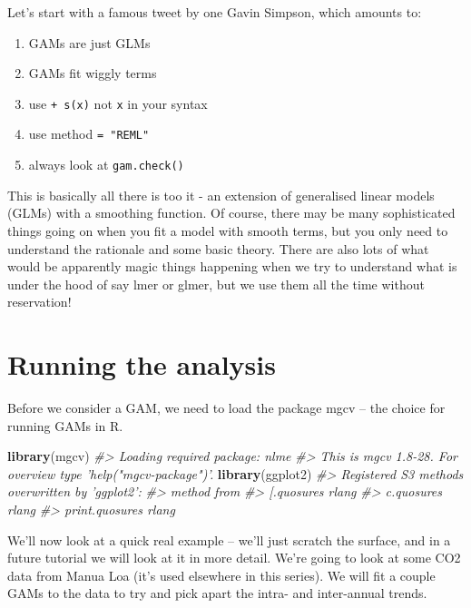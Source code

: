 \documentclass[]{book}
\newenvironment{Shaded}{\begin{snugshade}}{\end{snugshade}}
\newcommand{\CommentTok}[1]{\textcolor[rgb]{0.56,0.35,0.01}{\textit{#1}}}
\newcommand{\KeywordTok}[1]{\textcolor[rgb]{0.13,0.29,0.53}{\textbf{#1}}}
\newcommand{\NormalTok}[1]{#1}
\providecommand{\tightlist}{%
  \setlength{\itemsep}{0pt}\setlength{\parskip}{0pt}}
\begin{document}
Let's start with a famous tweet by one Gavin Simpson, which amounts to:

\begin{enumerate}
\def\labelenumi{\arabic{enumi}.}
\tightlist
\item
  GAMs are just GLMs
\item
  GAMs fit wiggly terms
\item
  use \texttt{+\ s(x)} not \texttt{x} in your syntax
\item
  use method \texttt{=\ "REML"}
\item
  always look at \texttt{gam.check()}
\end{enumerate}

This is basically all there is too it - an extension of generalised linear models (GLMs) with a smoothing function. Of course, there may be many sophisticated things going on when you fit a model with smooth terms, but you only need to understand the rationale and some basic theory. There are also lots of what would be apparently magic things happening when we try to understand what is under the hood of say lmer or glmer, but we use them all the time without reservation!

\hypertarget{running-the-analysis}{%
\section{Running the analysis}\label{running-the-analysis}}

Before we consider a GAM, we need to load the package mgcv -- the choice for running GAMs in R.

\begin{Shaded}
\begin{Highlighting}[]
\KeywordTok{library}\NormalTok{(mgcv)}
\CommentTok{#> Loading required package: nlme}
\CommentTok{#> This is mgcv 1.8-28. For overview type 'help("mgcv-package")'.}
\KeywordTok{library}\NormalTok{(ggplot2)}
\CommentTok{#> Registered S3 methods overwritten by 'ggplot2':}
\CommentTok{#>   method         from }
\CommentTok{#>   [.quosures     rlang}
\CommentTok{#>   c.quosures     rlang}
\CommentTok{#>   print.quosures rlang}
\end{Highlighting}
\end{Shaded}

We'll now look at a quick real example -- we'll just scratch the surface, and in a future tutorial we will look at it in more detail. We're going to look at some CO2 data from Manua Loa (it's used elsewhere in this series). We will fit a couple GAMs to the data to try and pick apart the intra- and inter-annual trends.
\end{document}
